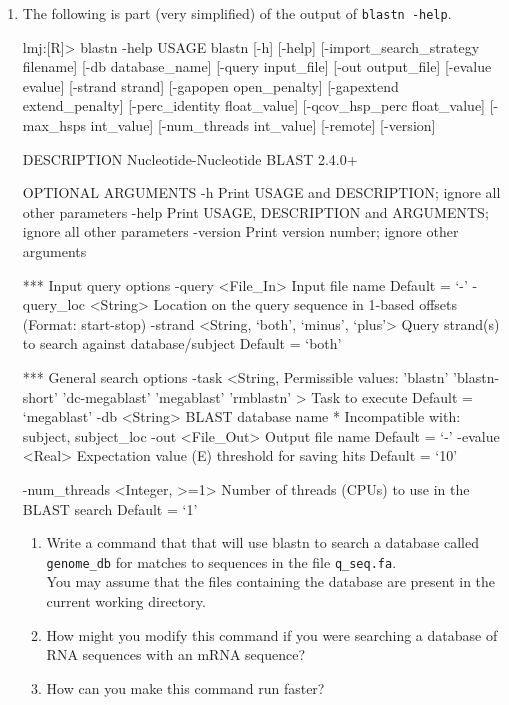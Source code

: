 \documentclass[11pt]{article}
\begin{document}
\begin{enumerate}
\item The following is part (very simplified) of the output of \texttt{blastn -help}.\\
  \begin{consolecode}
lmj:[R]> blastn -help 
USAGE                                                                                                                                                 
  blastn [-h] [-help] [-import_search_strategy filename]                                                                                              
    [-db database_name] [-query input_file]                                                                            
    [-out output_file] [-evalue evalue] [-strand strand]
    [-gapopen open_penalty] [-gapextend extend_penalty]                                                                                               
    [-perc_identity float_value] [-qcov_hsp_perc float_value]                                                                                         
    [-max_hsps int_value] [-num_threads int_value] [-remote]
    [-version]

DESCRIPTION
   Nucleotide-Nucleotide BLAST 2.4.0+

OPTIONAL ARGUMENTS
 -h
   Print USAGE and DESCRIPTION;  ignore all other parameters
 -help
   Print USAGE, DESCRIPTION and ARGUMENTS; ignore all other parameters
 -version
   Print version number;  ignore other arguments

 *** Input query options
 -query <File_In>
   Input file name
   Default = `-'
 -query_loc <String>
   Location on the query sequence in 1-based offsets (Format: start-stop)
 -strand <String, `both', `minus', `plus'>
   Query strand(s) to search against database/subject
   Default = `both'

 *** General search options
 -task <String, Permissible values: 'blastn' 'blastn-short' 'dc-megablast'
                'megablast' 'rmblastn' >
   Task to execute
   Default = `megablast'
 -db <String>
   BLAST database name
    * Incompatible with:  subject, subject_loc
 -out <File_Out>
   Output file name
   Default = `-'
 -evalue <Real>
   Expectation value (E) threshold for saving hits 
   Default = `10'

 -num_threads <Integer, >=1>
   Number of threads (CPUs) to use in the BLAST search
   Default = `1'
  \end{consolecode}

  \begin{enumerate}
  \item 
    Write a command that that will use blastn to search a database called
    \texttt{genome\_db} for matches to sequences in the file \texttt{q\_seq.fa}.\\
    You may assume that the files containing the database are present in the
    current working directory.
  \item How might you modify this command if you were searching a database of
    RNA sequences with an mRNA sequence?
  \item How can you make this command run faster?
  \end{enumerate}
\end{enumerate}
\end{document}
